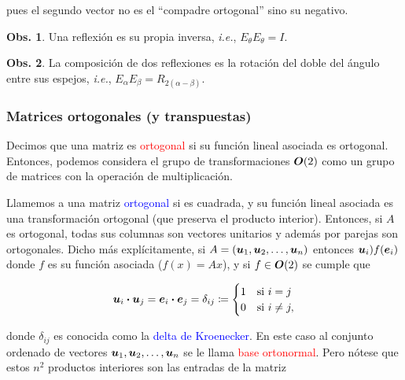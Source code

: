 \documentclass{article}
\theoremstyle{definicion}
\theoremstyle{definition}             %
\theoremstyle{definition}             %
\theoremstyle{definition}
\theoremstyle{definition}
\theoremstyle{observacion}
\newtheorem{obs}{Obs.}
\theoremstyle{definition}
\theoremstyle{plain}
\theoremstyle{definition}
\theoremstyle{afirmacion}
\theoremstyle{notation}
\theoremstyle{definition}
\begin{document}
    pues el segundo vector no es el ``compadre ortogonal'' sino su negativo.

    \begin{obs}
        Una reflexión es su propia inversa, \emph{i.e.}, \(E_{\theta}E_{\theta} = I\).
    \end{obs}

    \begin{obs}
        La composición de dos reflexiones es la rotación del doble del ángulo entre sus espejos, \emph{i.e.}, \(E_{\alpha}E_{\beta} = R_{2(\alpha - \beta)}\).
    \end{obs}

    \subsubsection*{Matrices ortogonales (y transpuestas)}

    Decimos que una matriz es \textcolor{red}{ortogonal} si su función lineal asociada es ortogonal. Entonces, podemos considera el grupo de transformaciones \(\vb*{O}(2)\) como un grupo de matrices con la operación de multiplicación.

    Llamemos a una matriz \textcolor{blue}{ortogonal} si es cuadrada, y su función lineal asociada es una transformación ortogonal (que preserva el producto interior). Entonces, si \(A\) es ortogonal, todas sus columnas son vectores unitarios y además por parejas son ortogonales. Dicho más explícitamente, si \(A = (\vb*{u}_{1}, \vb*{u}_{2}, \dots, \vb*{u}_{n})\) entonces \(\vb*{u}_{i} )f(\vb*{e}_{i})\) donde \(f\) es su función asociada (\(f(x) = Ax\)), y si \(f \in \vb*{O}(2)\) se cumple que

    \begin{equation*}
        \vb*{u}_{i} \vdot \vb*{u}_{j} = \vb*{e}_{i} \vdot \vb*{e}_{j} = \delta_{ij} \coloneq \begin{cases}
            1 & \text{si } i = j \\
            0 & \text{si } i \neq j,
        \end{cases}
    \end{equation*}

    donde \(\delta_{ij}\) es conocida como la \textcolor{blue}{delta de Kroenecker}. En este caso al conjunto ordenado de vectores \(\vb*{u}_{1}, \vb*{u}_{2}, \dots, \vb*{u}_{n}\) se le llama \textcolor{red}{base ortonormal}. Pero nótese que estos \(n^{2}\) productos interiores son las entradas de la matriz
\end{document}
